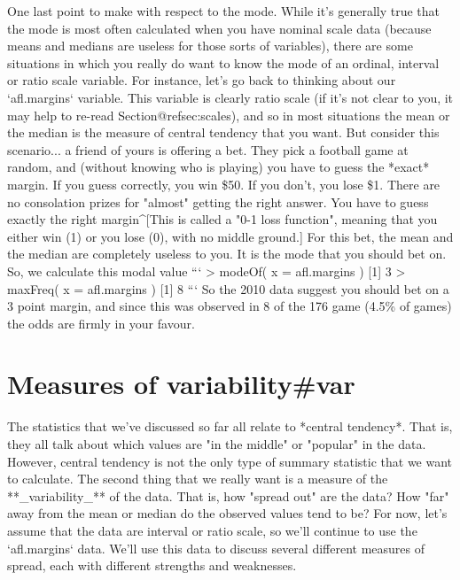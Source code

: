 One last point to make with respect to the mode. While it's generally true that the mode is most often calculated when you have nominal scale data (because means and medians are useless for those sorts of variables), there are some situations in which you really do want to know the mode of an ordinal, interval or ratio scale variable. For instance, let's go back to thinking about our `afl.margins` variable. This variable is clearly ratio scale (if it's not clear to you, it may help to re-read Section@refsec:scales), and so in most situations the mean or the median is the measure of central tendency that you want. But consider this scenario... a friend of yours is offering a bet. They pick a football game at random, and (without knowing who is playing) you have to guess the *exact* margin. If you guess correctly, you win \$50. If you don't, you lose \$1. There are no consolation prizes for "almost" getting the right answer. You have to guess exactly the right margin^[This is called a "0-1 loss function", meaning that you either win (1) or you lose (0), with no middle ground.] For this bet, the mean and the median are completely useless to you. It is the mode that you should bet on. So, we calculate this modal value
```
> modeOf( x = afl.margins )
[1] 3
> maxFreq( x = afl.margins )
[1] 8
```	
So the 2010 data suggest you should bet on a 3 point margin, and since this was observed in 8 of the 176 game (4.5\% of games) the odds are firmly in your favour. 










\section{Measures of variability{#var}}

The statistics that we've discussed so far all relate to *central tendency*. That is, they all talk about which values are "in the middle" or "popular" in the data. However, central tendency is not the only type of summary statistic that we want to calculate. The second thing that we really want is a measure of the **_variability_** of the data. That is, how "spread out" are the data? How "far" away from the mean or median do the observed values tend to be? For now, let's assume that the data are interval or ratio scale, so we'll continue to use the `afl.margins` data.  We'll use this data to discuss several different measures of spread, each with different strengths and weaknesses. 

